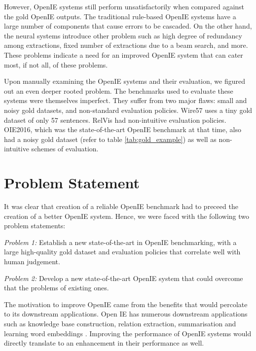   However, OpenIE systems still perform unsatisfactorily when compared against the gold OpenIE outputs. The traditional rule-based OpenIE systems have a large number of components that cause errors to be cascaded. On the other hand, the neural systems introduce other problem such as high degree of redundancy among extractions, fixed number of extractions due to a beam search, and more. These problems indicate a need for an improved OpenIE system that can cater most, if not all, of these problems.
  
  Upon manually examining the OpenIE systems and their evaluation, we figured out an even deeper rooted problem. The benchmarks used to evaluate these systems were themselves imperfect. They suffer from two major flaws: small and noisy gold datasets, and non-standard evaluation policies. Wire57 \citep{Wire57} uses a tiny gold dataset of only 57 sentences. RelVis had non-intuitive evaluation policies. OIE2016, which was the state-of-the-art OpenIE benchmark at that time, also had a noisy gold dataset (refer to table \ref{tab:gold_example}) as well as non-intuitive schemes of evaluation.

\section{Problem Statement}

  It was clear that creation of a reliable OpenIE benchmark had to preceed the creation of a better OpenIE system. Hence, we were faced with the following two problem statements:

  \textit{Problem 1:} Establish a new state-of-the-art in OpenIE benchmarking, with a large high-quality gold dataset and evaluation policies that correlate well with human judgement.

  \textit{Problem 2:} Develop a new state-of-the-art OpenIE system that could overcome that the problems of existing ones.
  
  The motivation to improve OpenIE came from the benefits that would percolate to its downstream applications. Open IE has numerous downstream applications such as knowledge base construction, relation extraction, summarisation and learning word embeddings \citep{embedding,survey}. Improving the performance of OpenIE systems would directly translate to an enhancement in their performance as well.

